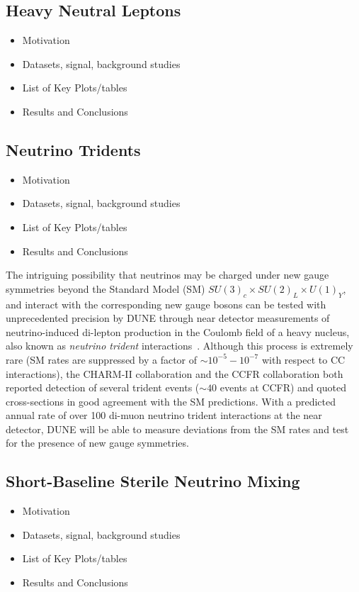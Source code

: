 \subsection{Heavy Neutral Leptons}
\begin{itemize}
\item Motivation
\item Datasets, signal, background studies
\item List of Key Plots/tables
\item Results and Conclusions
\end{itemize}

\subsection{Neutrino Tridents}
\begin{itemize}
\item Motivation
\item Datasets, signal, background studies
\item List of Key Plots/tables
\item Results and Conclusions
\end{itemize}
The intriguing possibility that neutrinos may be charged under new gauge symmetries beyond the Standard Model (SM) $SU(3)_c\times SU(2)_L\times U(1)_Y$, and interact with the corresponding new gauge bosons can be tested with unprecedented precision by DUNE through near detector measurements of neutrino-induced di-lepton production in the Coulomb field of a heavy nucleus, also known as {\it neutrino trident} interactions~\cite{Altmannshofer:2014pba}. Although this process is extremely rare (SM rates are suppressed by a factor of $\sim 10^{-5}-10^{-7}$ with respect to CC interactions), the CHARM-II collaboration \cite{Geiregat:1990gz} and the CCFR collaboration \cite{Mishra:1991bv} both reported detection of several trident events ($\sim 40$ events at CCFR) and quoted cross-sections in good agreement with the SM predictions. With a predicted annual rate of over 100 di-muon neutrino trident interactions at the near detector, DUNE will be able to measure deviations from the SM rates and test for the presence of new gauge symmetries.

\subsection{Short-Baseline Sterile Neutrino Mixing}
\begin{itemize}
\item Motivation
\item Datasets, signal, background studies
\item List of Key Plots/tables
\item Results and Conclusions
\end{itemize}





